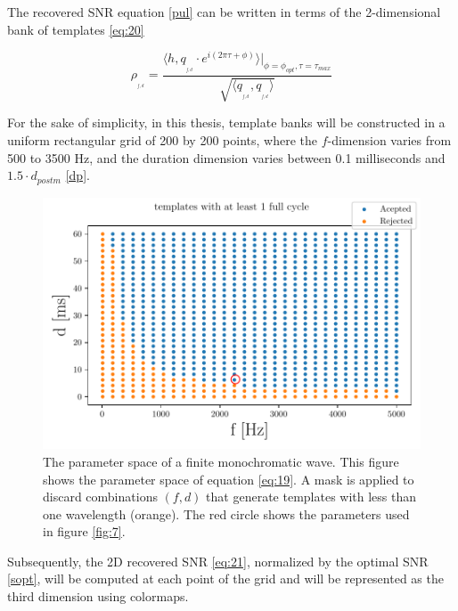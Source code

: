 The recovered SNR equation \ref{pul} can be written in terms of the 2-dimensional bank of templates \ref{eq:20}

\begin{equation}\label{eq:21}
\rho_{_{_{f,d}}} = \frac{\langle h, q_{_{_{f,d}}}\cdot e^{i(2\pi \tau+\phi)}\rangle \bigg\rvert_{\phi =\phi_{opt},\tau =\tau_{max}}}{\sqrt{\langle  q_{_{_{f,d}}},q_{_{_{f,d}}} \rangle}}
\end{equation}


For the sake of simplicity, in this thesis, template banks will be constructed in a uniform rectangular grid of 200 by 200 points, where the $f$-dimension varies from 500 to 3500 Hz, and the duration dimension varies between 0.1 milliseconds and $1.5 \cdot d_{postm}$ \ref{dp}. 

\begin{figure}[!htb]
\centering
\includegraphics[scale=0.6]{images/Data_analysis/results/param_space.pdf}
\captionsetup{width=0.8\textwidth}
\caption[The parameter space of a finite monochromatic wave]{The parameter space of a finite monochromatic wave. This figure shows the parameter space of equation \ref{eq:19}. A mask is applied to discard combinations $(f,d)$ that generate templates with less than one wavelength (orange). The red circle shows the parameters used in figure \ref{fig:7}.}
\label{fig:11}
\end{figure}
\FloatBarrier


Subsequently, the 2D recovered SNR \ref{eq:21}, normalized by the optimal SNR \ref{sopt}, will be computed at each point of the grid and will be represented as the third dimension using colormaps. 



